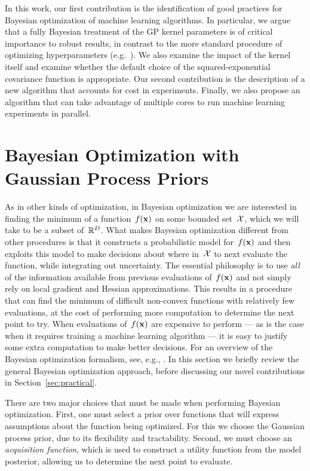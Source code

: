 \documentclass[aos,preprint]{imsart}
\begin{document}
In this work, our first contribution is the identification of good
practices for Bayesian optimization of machine learning algorithms.
In particular, we argue that a fully Bayesian treatment of the GP
kernel parameters is of critical importance to robust results, in
contrast to the more standard procedure of optimizing hyperparameters
(e.g.\ \citet{BergstraJ2011}).  We also examine the impact of the
kernel itself and examine whether the default choice of the
squared-exponential covariance function is appropriate.  Our second
contribution is the description of a new algorithm that accounts for
cost in experiments.  Finally, we also propose an algorithm that can
take advantage of multiple cores to run machine learning experiments
in parallel.

\section{Bayesian Optimization with Gaussian Process Priors}
As in other kinds of optimization, in Bayesian optimization we are
interested in finding the minimum of a function~$f(\boldsymbol{\mathrm{x}})$ on some
bounded set~$\mathcal{X}$, which we will take to be a subset of~$\mathbb{R}^D$.
What makes Bayesian optimization different from other procedures is
that it constructs a probabilistic model for~$f(\boldsymbol{\mathrm{x}})$ and then
exploits this model to make decisions about where in~$\mathcal{X}$ to next
evaluate the function, while integrating out uncertainty.  The
essential philosophy is to use \emph{all} of the information available
from previous evaluations of~$f(\boldsymbol{\mathrm{x}})$ and not simply rely on local
gradient and Hessian approximations.  This results in a procedure that
can find the minimum of difficult non-convex functions with relatively
few evaluations, at the cost of performing more computation to
determine the next point to try.  When evaluations of~$f(\boldsymbol{\mathrm{x}})$ are
expensive to perform --- as is the case when it requires training a
machine learning algorithm --- it is easy to justify some extra
computation to make better decisions.  For an overview of the Bayesian
optimization formalism, see, e.g., \citet{brochu-etal-2010a}.  In this
section we briefly review the general Bayesian optimization approach,
before discussing our novel contributions in
Section~\ref{sec:practical}.

There are two major choices that must be made when performing Bayesian
optimization.  First, one must select a prior over functions that will
express assumptions about the function being optimized.  For this we
choose the Gaussian process prior, due to its flexibility and
tractability.  Second, we must choose an \emph{acquisition function},
which is used to construct a utility function from the model
posterior, allowing us to determine the next point to evaluate.
\end{document}
